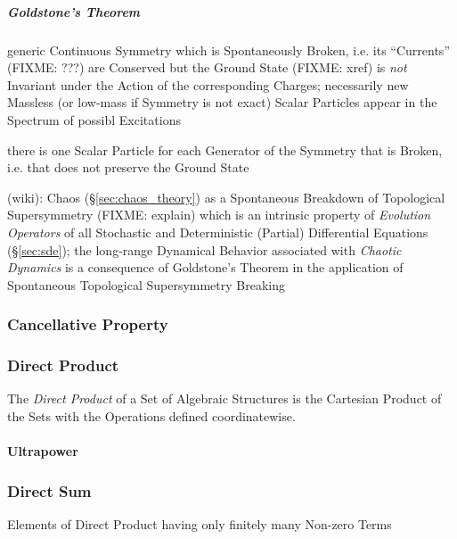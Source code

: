 \subparagraph{Goldstone's Theorem}\label{sec:goldstones_theorem}\hfill

generic Continuous Symmetry which is Spontaneously Broken, i.e. its ``Currents''
(FIXME: ???) are Conserved but the Ground State (FIXME: xref) is \emph{not}
Invariant under the Action of the corresponding Charges; necessarily new
Massless (or low-mass if Symmetry is not exact) Scalar Particles appear in the
Spectrum of possibl Excitations

there is one Scalar Particle for each Generator of the Symmetry that is Broken,
i.e. that does not preserve the Ground State

(wiki): Chaos (\S\ref{sec:chaos_theory}) as a Spontaneous Breakdown of
Topological Supersymmetry (FIXME: explain) which is an intrinsic property of
\emph{Evolution Operators} of all Stochastic and Deterministic (Partial)
Differential Equations (\S\ref{sec:sde}); the long-range Dynamical Behavior
associated with \emph{Chaotic Dynamics} is a consequence of Goldstone's Theorem
in the application of Spontaneous Topological Supersymmetry Breaking



\subsubsection{Cancellative Property}\label{sec:cancellative_property}

\subsubsection{Direct Product}\label{sec:direct_product}

The \emph{Direct Product} of a Set of Algebraic Structures is the
Cartesian Product of the Sets with the Operations defined
coordinatewise.



\paragraph{Ultrapower}\label{sec:ultrapower}\hfill



\subsubsection{Direct Sum}\label{sec:direct_sum}

Elements of Direct Product having only finitely many Non-zero Terms

